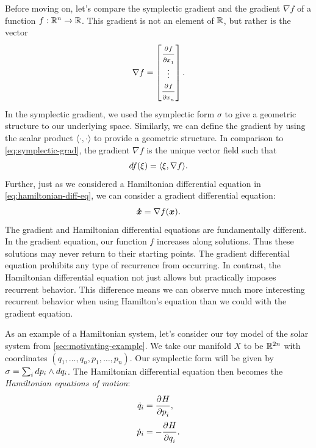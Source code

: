 \documentclass[twoside,letterpaper,10pt]{article}
\numberwithin{equation}{section}
\begin{document}
Before moving on, let's compare the symplectic gradient and the gradient $\nabla
f$ of a function $f : \mathbb{R}^n \to \mathbb{R}$.
This gradient is not an element of $\mathbb{R}$, but rather is the vector
\begin{equation*}
  \nabla f =
  \begin{bmatrix}
    \frac{\strut\partial^{}f}{\strut\partial x_1^{}}\\
    \vdots\\
    \frac{\strut\partial^{}f}{\strut\partial x_n^{}}
  \end{bmatrix}.
\end{equation*}
In the symplectic gradient, we used the symplectic form $\sigma$ to give a
geometric structure to our underlying space.
Similarly, we can define the gradient by using the scalar product $\langle
\cdot, \cdot \rangle$ to provide a geometric structure.
In comparison to \cref{eq:symplectic-grad}, the gradient $\nabla f$ is the
unique vector field such that
\begin{equation*}
  \mathop{}\!d f(\xi) = \langle \xi, \nabla f \rangle.
\end{equation*}
Further, just as we considered a Hamiltonian differential equation in
\cref{eq:hamiltonian-diff-eq}, we can consider a gradient differential equation:
\begin{equation*}
  \bm{\dot{x}} = \nabla f(\bm{x}).
\end{equation*}
The gradient and Hamiltonian differential equations are fundamentally different.
In the gradient equation, our function $f$ increases along solutions.
Thus these solutions may never return to their starting points.
The gradient differential equation prohibits any type of recurrence from
occurring.
In contrast, the Hamiltonian differential equation not just allows but
practically imposes recurrent behavior.
This difference means we can observe much more interesting recurrent behavior
when using Hamilton's equation than we could with the gradient equation.

As an example of a Hamiltonian system, let's consider our toy model of the solar
system from \cref{sec:motivating-example}.
We take our manifold $X$ to be $\mathbb{R}^{2n}$ with coordinates $(q_1, \ldots, q_n,
p_1, \ldots, p_n)$.
Our symplectic form will be given by $\sigma = \sum_{i} \mathop{}\!d p_i \wedge \mathop{}\!d
q_i$.
The Hamiltonian differential equation then becomes the \emph{Hamiltonian
  equations of motion}:
\begin{equation}
  \label{eq:hamiltonian-motion-eq}
  \begin{aligned}
    \dot{q}_i &= \frac{\strut\partial^{}H}{\strut\partial p_i^{}},\\
    \dot{p}_i &= - \frac{\strut\partial^{}H}{\strut\partial q_i^{}}.
  \end{aligned}
\end{equation}
\end{document}
